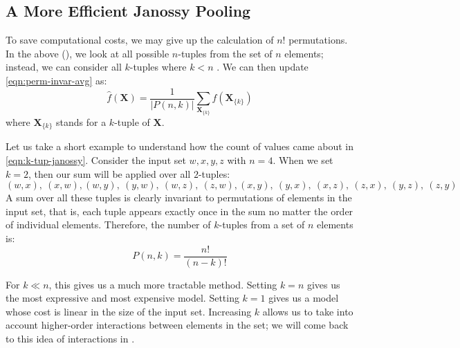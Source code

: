 \subsection{A More Efficient Janossy Pooling}\label{ssec:efficient-janossy}

To save computational costs, we may give up the calculation of $n!$ permutations. In the above (), we look at all possible $n$-tuples from the set of $n$ elements; instead, we can consider all $k$-tuples where $k \less n$ \parencite{Murphy2018}. We can then update \cref{eqn:perm-invar-avg} as:
\begin{equation}
    \label{eqn:k-tup-janossy}
    \widehat{f}(\symbf{X}) = \frac{1}{|P(n, k)|} \sum_{\symbf{X}_{\{k\}}} f(\symbf{X}_{\{k\}})
\end{equation}
where $\symbf{X}_{\{k\}}$ stands for a $k$-tuple of $\symbf{X}$.

Let us take a short example to understand how the count of values came about in \cref{eqn:k-tup-janossy}. Consider the input set ${w, x, y, z}$ with $n=4$. When we set $k=2$, then our sum will be applied over all $2$-tuples:
\[(w, x),~(x, w),(w, y),~(y, w),~(w, z),~(z, w),
(x, y),~(y, x),~(x, z),~(z, x),~(y, z),~(z, y)
\]
A sum over all these tuples is clearly invariant to permutations of elements in the input set, that is, each tuple appears exactly once in the sum no matter the order of individual elements. Therefore, the number of $k$-tuples from a set of $n$ elements is:
\begin{equation}
\label{eqn:k-tup-cnt}
    P(n,k) = \frac{n!}{(n-k)!}
\end{equation}

For $k \ll n$, this gives us a much more tractable method. Setting $k=n$ gives us the most expressive and most expensive model. Setting $k=1$ gives us a model whose cost is linear in the size of the input set. Increasing $k$ allows us to take into account higher-order interactions between elements in the set; we will come back to this idea of interactions in .

